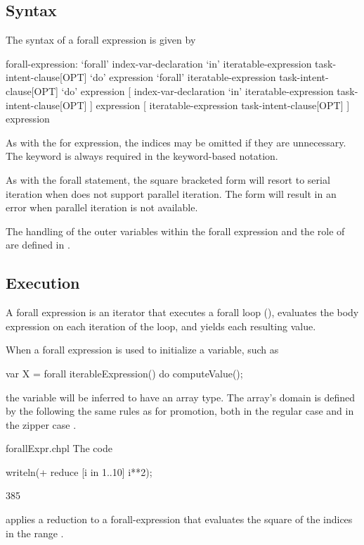 \subsection{Syntax}
\label{forall_expr_syntax}

The syntax of a forall expression is given by
\begin{syntax}
forall-expression:
  `forall' index-var-declaration `in' iteratable-expression task-intent-clause[OPT] `do' expression
  `forall' iteratable-expression task-intent-clause[OPT] `do' expression
  [ index-var-declaration `in' iteratable-expression task-intent-clause[OPT] ] expression
  [ iteratable-expression task-intent-clause[OPT] ] expression
\end{syntax}
As with the for expression, the indices may be omitted if they are
unnecessary.  The  keyword is always required in the
keyword-based notation.

As with the forall statement, the square bracketed
form will resort to serial iteration when 
does not support parallel iteration.  The  form will
result in an error when parallel iteration is not available.

The handling of the outer variables within the forall expression and
the role of  are defined in .

\subsection{Execution}
\label{Forall_Expression_Execution}

A forall expression is an iterator that executes a forall loop (),
evaluates the body expression on each iteration of the loop,
and yields each resulting value.

When a forall expression is used to initialize a variable, such as
\begin{chapel}
var X = forall iterableExpression() do computeValue();
\end{chapel}
the variable will be inferred to have an array type.
The array's domain is defined by the 
following the same rules as for promotion, both in the regular
case  and in the zipper case .

\begin{chapelexample}{forallExpr.chpl}
The code
\begin{chapel}
writeln(+ reduce [i in 1..10] i**2);
\end{chapel}
\begin{chapeloutput}
385
\end{chapeloutput}
applies a reduction to a forall-expression that evaluates the square
of the indices in the range .
\end{chapelexample}

